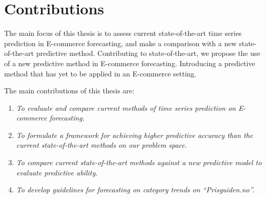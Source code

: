 \section{Contributions}
\label{sections:Introduction:Contributions}



The main focus of this thesis is to assess current state-of-the-art time series prediction in E-commerce forecasting,
and make a comparison with a new state-of-the-art predictive method.
Contributing to state-of-the-art,
we propose the use of a new predictive method in E-commerce forecasting.
Introducing a predictive method that has yet to be applied in an E-commerce setting.

The main contributions of this thesis are:
\begin{enumerate}
  \item {\it To evaluate and compare current methods of time series prediction on E-commerce forecasting.}
  \item {\it To formulate a framework for achieving higher predictive accuracy than the current state-of-the-art methods on our problem space.}
  \item {\it To compare current state-of-the-art methods against a new predictive model to evaluate predictive ability.}
  \item {\it To develop guidelines for forecasting on category trends on ``Prisguiden.no''.}
\end{enumerate}




\iffalse
  The main focus of this work is to assess the current state of time series prediction in E-commerce forecasting.
  Contributing to the current state of the art,
  we propose a method for increasing the predictive ability of time series forecasting
  assessing interest trends of E-commerce product categories.
  The main contributions of this thesis are:

  \begin{enumerate}
    \item {\it To evaluate and compare current methods of time series prediction on E-commerce.}
    \item {\it To evaluate and compare current state-of-the-art methods for time series forecasting.}
    \item {\it Formulates a framework for achieving higher predictive accuracy than the current state-of-the-art methods on our problem space.}
  \end{enumerate}
\fi


